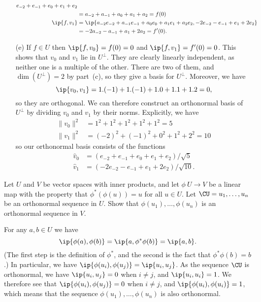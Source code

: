 \begin{solution}
\begin{itemize}
\begin{align*}
{                      e_{-2} + e_{-1} + e_0 + e_1 + e_2 } \\
               &= a_{-2} + a_{-1} + a_0 + a_1 + a_2 = f(0) \\
    \ip{f,v_1} &= \ip{a_{-2}e_{-2}+a_{-1}e_{-1}+a_0e_0+a_1e_1+a_2e_2,
                      -2e_{-2} - e_{-1} + e_1 + 2 e_2 } \\
               &= -2a_{-2} - a_{-1} + a_1 + 2 a_2 = f'(0).
   \end{align*}
  \item[(e)] If $f\in U$ then $\ip{f,v_0}=f(0)=0$ and
   $\ip{f,v_1}=f'(0)=0$.  This shows that $v_0$ and $v_1$ lie in
   $U^\perp$.  They are clearly linearly independent, as neither one
   is a multiple of the other.  There are two of them, and
   $\dim(U^\perp)=2$ by part~(c), so they give a basis for $U^\perp$.
   Moreover, we have
   \[ \ip{v_0,v_1} = 1.(-1) + 1.(-1) + 1.0 + 1.1 + 1.2 = 0, \]
   so they are orthogonal.  We can therefore construct an orthonormal
   basis of $U^\perp$ by dividing $v_0$ and $v_1$ by their norms.
   Explicitly, we have 
   \begin{align*}
    \|v_0\|^2 &= 1^2 + 1^2 + 1^2 + 1^2 + 1^2 = 5 \\
    \|v_1\|^2 &= (-2)^2 + (-1)^2 + 0^2 + 1^2 + 2^2 = 10
   \end{align*}
   so our orthonormal basis consists of the functions
   \begin{align*}
    \hat{v}_0 &= (e_{-2} + e_{-1} + e_0 + e_1 + e_2)/\sqrt{5} \\
    \hat{v}_1 &= (-2e_{-2} -e_{-1} + e_1 + 2e_2)/\sqrt{10}.
   \end{align*}
 \end{itemize}
\end{solution}

\begin{exercise}\label{ex-isometric-embedding}
 Let $U$ and $V$ be vector spaces with inner products, and
 let $\phi\:U\to V$ be a linear map with the property that
 $\phi^*(\phi(u))=u$ for all $u\in U$.  Let
 $\CU=u_1,\dotsc,u_n$ be an orthonormal sequence in $U$.
 Show that $\phi(u_1),\dotsc,\phi(u_n)$ is an orthonormal
 sequence in $V$.
\end{exercise}
\begin{solution}
 For any $a,b\in U$ we have 
 \[ \ip{\phi(a),\phi(b)}=\ip{a,\phi^*\phi(b)}=\ip{a,b}. \]
 (The first step is the definition of $\phi^*$, and the
 second is the fact that $\phi^*\phi(b)=b$.)  In particular,
 we have $\ip{\phi(u_i),\phi(u_j)}=\ip{u_i,u_j}$.  As the
 sequence $\CU$ is orthonormal, we have $\ip{u_i,u_j}=0$
 when $i\neq j$, and $\ip{u_i,u_i}=1$.  We therefore see
 that $\ip{\phi(u_i),\phi(u_j)}=0$ when $i\neq j$, and
 $\ip{\phi(u_i),\phi(u_i)}=1$, which means that the sequence
 $\phi(u_1),\dotsc,\phi(u_n)$ is also orthonormal.
\end{solution}

